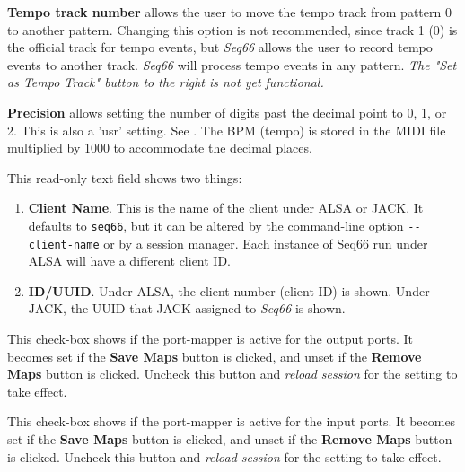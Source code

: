    \textbf{Tempo track number}
   allows the user to move the tempo track from pattern 0 to
   another pattern.  Changing this option is not recommended, since track 1 (0)
   is the official track for tempo events, but \textsl{Seq66} allows the
   user to record tempo events to another track.  \textsl{Seq66} will
   process tempo events in any pattern.
   \textsl{The "Set as Tempo Track" button to the right is not yet functional.}

   \textbf{Precision}
   allows setting the number of digits past the decimal point to 0, 1, or 2.
   This is also a 'usr' setting.
   See .
   The BPM (tempo) is stored in the MIDI file multiplied by 1000 to accommodate
   the decimal places.

   This read-only text field shows two things:

   \begin{enumerate}
      \item \textbf{Client Name}.
         This is the name of the client under ALSA or JACK.  It defaults to
         \texttt{seq66}, but it can be altered by the command-line option
         \texttt{-{}-client-name} or by a session manager.
         Each instance of Seq66 run under ALSA will have a different client ID.
      \item \textbf{ID/UUID}.
         Under ALSA, the client number (client ID) is shown.
         Under JACK, the UUID that JACK assigned to \textsl{Seq66} is shown.
   \end{enumerate}

   This check-box shows if the port-mapper is active for the output ports.
   It becomes set if the \textbf{Save Maps} button is clicked, and unset if the
   \textbf{Remove Maps} button is clicked.
   Uncheck this button and \textsl{reload session} for the setting
   to take effect.

   This check-box shows if the port-mapper is active for the input ports.
   It becomes set if the \textbf{Save Maps} button is clicked, and unset if the
   \textbf{Remove Maps} button is clicked.
   Uncheck this button and \textsl{reload session} for the setting
   to take effect.


